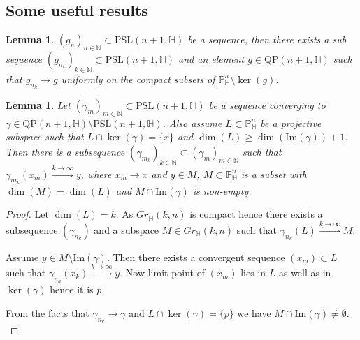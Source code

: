 \documentclass[12pt,reqno]{amsart}
\numberwithin{equation}{section}
\newtheorem{lemma}[theorem]{Lemma}
\theoremstyle{definition}
\def\H{\mathbb H}
\def\N{\mathbb N}
\def\P{\mathbb P}
\def\N{\mathbb {N}}
\def\H{\mathbb {H}}
\begin{document}
   \subsection{Some useful results}
     \begin{lemma}\cite[Lemma~2.9]{dgm}
			\label{lem:p1}
			$(g_n)_{n\in \N}\subset \mathrm{PSL}(n+1,\H)$ be a sequence, then there exists a sub sequence $(g_{n_k})_{k\in \N}\subset \mathrm{PSL}(n+1,\H)$ and an element $g\in \mathrm{QP}(n+1,\H)$ such that $g_{n_k}\rightarrow g$ uniformly on the compact subsets of $\P^n_\H\setminus \ker(g)$.
		\end{lemma}
    \begin{lemma}\label{lem:ker0}
  Let $(\gamma_m)_{m\in \N}\subset \mathrm{PSL}(n+1,\H)$ be a sequence converging to $\gamma\in \mathrm{QP}(n+1,\H)\setminus \mathrm{PSL}(n+1,\H)$. Also assume $L\subset \P^n_\H$ be a projective subspace such that $L\cap \ker(\gamma)=\{x\}$ and $\dim(L)\geq \dim(\mathrm{Im}(\gamma))+1$. Then there is a subsequence $(\gamma_{m_k})_{k\in\N}\subset (\gamma_m)_{m\in\N}$ such that $\gamma_{m_k}(x_m)\xrightarrow{k\rightarrow\infty}y$, where $x_m\rightarrow x$ and $y\in M$, $M\subset \P^n_\H$ is a subset with $\dim(M)=\dim(L)$ and $M\cap \mathrm{Im}(\gamma)$ is non-empty.
   \end{lemma}
   \begin{proof}
       Let $\dim(L)=k$. As $Gr_\H(k,n)$ is compact hence there exists a subsequence $(\gamma_{n_k})$ and a subspace $M\in Gr_\H(k,n)$ such that $\gamma_{n_k}(L)\xrightarrow{k\rightarrow \infty}M$.
       \par Assume $y\in M\setminus \mathrm{Im}(\gamma)$. Then there exists a convergent sequence $(x_m)\subset L$ such that $\gamma_{n_k}(x_k)\xrightarrow{k\rightarrow \infty} y$. Now limit point of $(x_m)$ lies in $L$ as well as in $\ker(\gamma)$ hence it is $p$.
       \par From the facts that $\gamma_{n_k}\rightarrow \gamma$ and $L\cap \ker(\gamma)=\{p\}$ we have $M\cap \mathrm{Im}(\gamma)\neq \emptyset.$
   \end{proof}
   	
\end{document}
